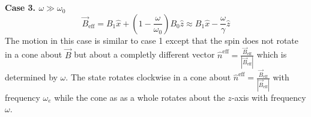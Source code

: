 \documentclass[12pt]{extarticle}
\begin{document}
\\ \\ \textbf{Case 3. $\omega \gg \omega_0$} \\  
\[\vec{B}_{\mathrm{eff}} = B_1 \hat{x} + \left(1 - \frac{\omega}{\omega_0} \right) B_0 \hat{z} \approx B_1 \hat{x} - \frac{\omega}{\gamma} \hat{z}\]
The motion in this case is similar to case 1 except that the spin does not rotate in a cone about $\vec{B}$ but about a completly different vector $\hat{n}^{\mathrm{eff}} = \frac{\vec{B}_{\mathrm{eff}}}{|\vec{B}_{\mathrm{eff}}|}$ which is determined by $\omega$. The state rotates clockwise in a cone about $\hat{n}^{\mathrm{eff}} = \frac{\vec{B}_{\mathrm{eff}}}{|\vec{B}_{\mathrm{eff}}|}$ with frequency $\omega_e$ while the cone as as a whole rotates about the $z$-axis with frequency $\omega$.    
\end{document}
